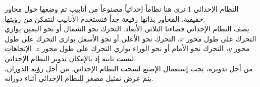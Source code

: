 \begin{surferPage}[Coordinates I]{النظام الإحداثي 1}
نرى هنا نظاماً إحداثياً مصنوعاً من أنابيب تم وضعها حول محاور حقيقية. المحاور بذاتها رفيعة جداً فنستخدم الأنابيب لنتمكن من رؤيتها.\\
يصف النظام الإحداثي فضاءنا الثلاثي الأبعاد. التحرك نحو الشمال أو نحو اليمين يوازي التحرك على طول محور $x$، التحرك نحو الأعلى أو نحو الأسفل يوازي التحرك على طول محور $y$، التحرك نحو الأمام أو نحو الوراء يوازي التحرك على طول محور $z$. الإتجاهات ليست ثابتة إذ بالإمكان تدوير النظام الإحداثي.\\ 
\vspace{0.3cm}
من أجل تدويره، يجب إستعمال الإصبع لسحب النظام الإحداثي. من أجل رؤية الدوران، يتم عرض تمثيل مصغر للنظام الإحداثي أثناء دورانه.
\end{surferPage}